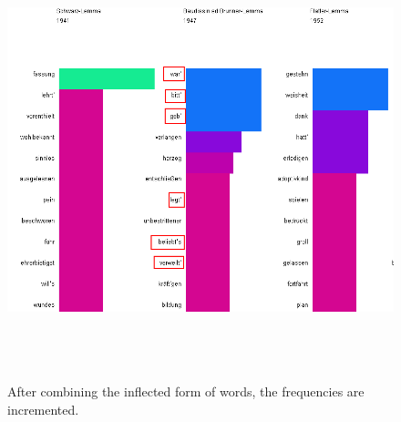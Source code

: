 \begin{figure}[h]
	\centering	
	\includegraphics[width=16cm, height=12cm]{Figs/Marking-Feedback}\\[1ex]
	\caption{} After combining the inflected form of words, the frequencies are incremented.
	\label{fig:feedback}
\end{figure} 




